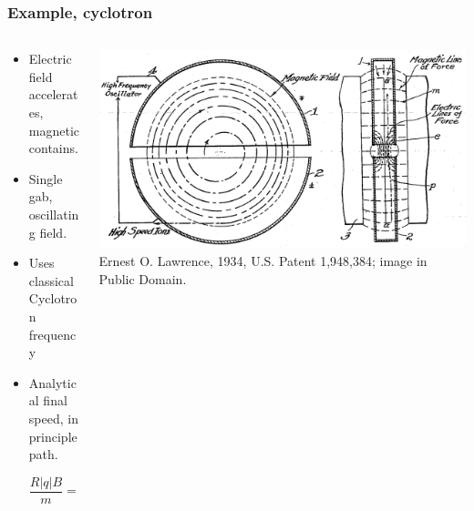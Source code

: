 \documentclass{beamer}
\begin{document}

\begin{frame}
\frametitle{Example, cyclotron}
\begin{columns}
\begin{column}{0.5\linewidth}
\begin{itemize}
\item<1-> Electric field accelerates, magnetic contains.

\item<2-> Single gab, oscillating field.

\item<3-> Uses classical Cyclotron frequency

\item<4-> Analytical final speed, in principle path.

\begin{equation*}
\frac{R|q|B}{m} = v_\perp
\end{equation*}

\end{itemize}
\end{column}
\begin{column}{0.5\linewidth}
\includegraphics[width=\linewidth]{ Cyclotron_patent.png}
{\color{gray} Ernest O. Lawrence, 1934, U.S. Patent 1,948,384; image in Public Domain.}
\end{column}
\end{columns}
\end{frame}
\end{document}
